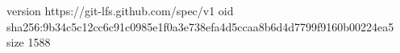 version https://git-lfs.github.com/spec/v1
oid sha256:9b34c5c12cc6c91c0985e1f0a3e738efa4d5ccaa8b6d4d7799f9160b00224ea5
size 1588
